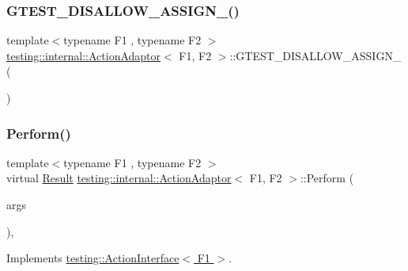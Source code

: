 \subsubsection{\texorpdfstring{G\+T\+E\+S\+T\+\_\+\+D\+I\+S\+A\+L\+L\+O\+W\+\_\+\+A\+S\+S\+I\+G\+N\+\_\+()}{GTEST\_DISALLOW\_ASSIGN\_()}}
{\footnotesize\ttfamily template$<$typename F1 , typename F2 $>$ \\
\hyperlink{classtesting_1_1internal_1_1ActionAdaptor}{testing\+::internal\+::\+Action\+Adaptor}$<$ F1, F2 $>$\+::G\+T\+E\+S\+T\+\_\+\+D\+I\+S\+A\+L\+L\+O\+W\+\_\+\+A\+S\+S\+I\+G\+N\+\_\+ (\begin{DoxyParamCaption}\item[{\hyperlink{classtesting_1_1internal_1_1ActionAdaptor}{Action\+Adaptor}$<$ F1, F2 $>$}]{ }\end{DoxyParamCaption})\hspace{0.3cm}{\ttfamily [private]}}

\mbox{\label{classtesting_1_1internal_1_1ActionAdaptor_a8d8a47a31f068cf6e0c95b91605d5540}} 
\subsubsection{\texorpdfstring{Perform()}{Perform()}}
{\footnotesize\ttfamily template$<$typename F1 , typename F2 $>$ \\
virtual \hyperlink{classtesting_1_1internal_1_1ActionAdaptor_afa8f7872b6db3d8f1545fd98b45b0b95}{Result} \hyperlink{classtesting_1_1internal_1_1ActionAdaptor}{testing\+::internal\+::\+Action\+Adaptor}$<$ F1, F2 $>$\+::Perform (\begin{DoxyParamCaption}\item[{const \hyperlink{classtesting_1_1internal_1_1ActionAdaptor_a4f78fb73f97b72fea8a93b78a8ab5704}{Argument\+Tuple} \&}]{args }\end{DoxyParamCaption})\hspace{0.3cm}{\ttfamily [inline]}, {\ttfamily [virtual]}}



Implements \hyperlink{classtesting_1_1ActionInterface_a20f8624fcea1786f2992b358760422a0}{testing\+::\+Action\+Interface$<$ F1 $>$}.



